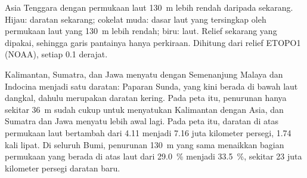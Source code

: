 \begin{omfigure}

{\small Asia Tenggara dengan permukaan laut \qty{130}{m} lebih rendah daripada
sekarang. Hijau: daratan sekarang; cokelat muda: dasar laut yang tersingkap oleh
permukaan laut yang \qty{130}{m} lebih rendah; biru: laut. Relief sekarang yang
dipakai, sehingga garis pantainya hanya perkiraan. Dihitung dari relief ETOPO1
(NOAA), setiap 0.1 derajat.}
\end{omfigure}

Kalimantan, Sumatra, dan Jawa menyatu dengan Semenanjung Malaya dan Indocina
menjadi satu daratan: Paparan Sunda, yang kini berada di bawah laut dangkal,
dahulu merupakan daratan kering. Pada peta itu, penurunan hanya sekitar
\qty{36}{m} sudah cukup untuk menyatukan Kalimantan dengan Asia, dan Sumatra
dan Jawa menyatu lebih awal lagi. Pada peta itu,
daratan di atas permukaan laut bertambah dari 4.11 menjadi 7.16 juta kilometer
persegi, 1.74 kali lipat. Di seluruh Bumi, penurunan \qty{130}{m} yang sama
menaikkan bagian permukaan yang berada di atas laut dari \qty{29.0}{\percent}
menjadi \qty{33.5}{\percent}, sekitar 23 juta kilometer persegi daratan baru.

